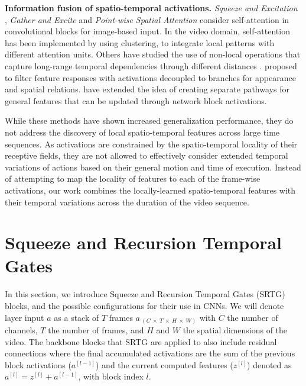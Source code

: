 \documentclass[final,5p,times,twocolumn]{elsarticle}
\begin{document}
\textbf{Information fusion of spatio-temporal activations.} \textit{Squeeze and Excitation} \citep{hu2018squeeze}, \textit{Gather and Excite} \citep{hu2018gather} and \textit{Point-wise Spatial Attention} \citep{zhao2018psanet} consider self-attention in convolutional blocks for image-based input. In the video domain, self-attention has been implemented by \citet{long2018attention} using clustering, to integrate local patterns with different attention units. Others have studied the use of non-local operations that capture long-range temporal dependencies through different distances \citep{wang2018non}. \citet{wang2018appearance} proposed to filter feature responses with activations decoupled to branches for appearance and spatial relations. \citet{qiu2019learning} have extended the idea of creating separate pathways for general features that can be updated through network block activations.

While these methods have shown increased generalization performance, they do not address the discovery of local spatio-temporal features across large time sequences. As activations are constrained by the spatio-temporal locality of their receptive fields, they are not allowed to effectively consider extended temporal variations of actions based on their general motion and time of execution. Instead of attempting to map the locality of features to each of the frame-wise activations, our work combines the locally-learned spatio-temporal features with their temporal variations across the duration of the video sequence.



\section{Squeeze and Recursion Temporal Gates}
\label{sec:methodology}

In this section, we introduce Squeeze and Recursion Temporal Gates (SRTG) blocks, and the possible configurations for their use in CNNs. We will denote layer input $a$ as a stack of $T$ frames $a_{\: (C \: \times \: T \: \times \: H \: \times \: W)}$ with $C$ the number of channels, $T$ the number of frames, and $H$ and $W$ the spatial dimensions of the video. The backbone blocks that SRTG are applied to also include residual connections where the final accumulated activations are the sum of the previous block activations ($a^{[l-1]}$) and the current computed features ($z^{[l]}$) denoted as $a^{[l]} = z^{[l]} + a^{[l-1]}$, with block index $l$.
\end{document}
